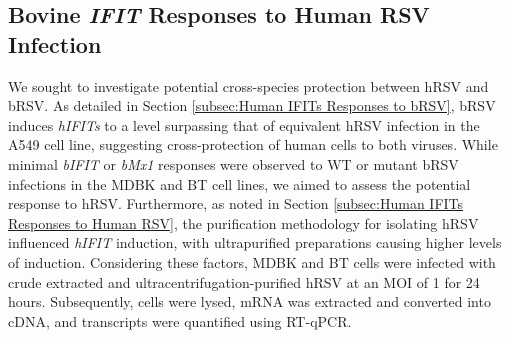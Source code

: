 \subsection{Bovine \textit{IFIT} Responses to Human RSV Infection} \label{subsec:Bovine IFITs Responses to hRSV Infection}
We sought to investigate potential cross-species protection between hRSV and bRSV. As detailed in Section \ref{subsec:Human IFITs Responses to bRSV}, bRSV induces \textit{hIFITs} to a level surpassing that of equivalent hRSV infection in the A549 cell line, suggesting cross-protection of human cells to both viruses. While minimal \textit{bIFIT} or \textit{bMx1} responses were observed to WT or mutant bRSV infections in the MDBK and BT cell lines, we aimed to assess the potential response to hRSV. Furthermore, as noted in Section \ref{subsec:Human IFITs Responses to Human RSV}, the purification methodology for isolating hRSV influenced \textit{hIFIT} induction, with ultrapurified preparations causing higher levels of induction. Considering these factors, MDBK and BT cells were infected with crude extracted and ultracentrifugation-purified hRSV at an MOI of 1 for 24 hours. Subsequently, cells were lysed, mRNA was extracted and converted into cDNA, and transcripts were quantified using RT-qPCR.

